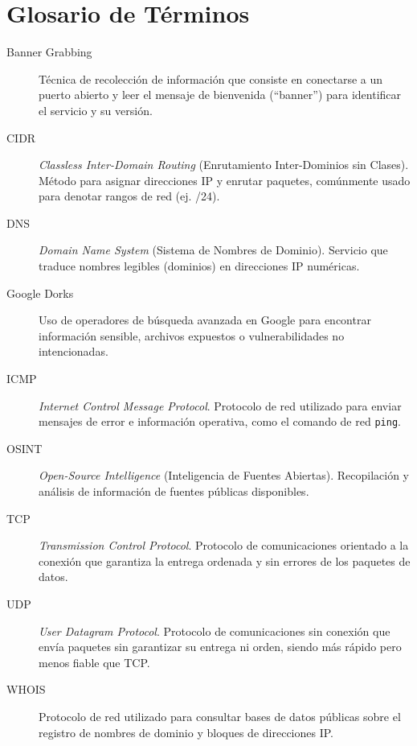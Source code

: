 \documentclass[12pt,a4paper]{article}
\begin{document}
\newpage
\section*{Glosario de Términos}
\begin{description}
    \item[Banner Grabbing] Técnica de recolección de información que consiste en conectarse a un puerto abierto y leer el mensaje de bienvenida (``banner'') para identificar el servicio y su versión.
    \item[CIDR] \textit{Classless Inter-Domain Routing} (Enrutamiento Inter-Dominios sin Clases). Método para asignar direcciones IP y enrutar paquetes, comúnmente usado para denotar rangos de red (ej. /24).
    \item[DNS] \textit{Domain Name System} (Sistema de Nombres de Dominio). Servicio que traduce nombres legibles (dominios) en direcciones IP numéricas.
    \item[Google Dorks] Uso de operadores de búsqueda avanzada en Google para encontrar información sensible, archivos expuestos o vulnerabilidades no intencionadas.
    \item[ICMP] \textit{Internet Control Message Protocol}. Protocolo de red utilizado para enviar mensajes de error e información operativa, como el comando de red \texttt{ping}.
    \item[OSINT] \textit{Open-Source Intelligence} (Inteligencia de Fuentes Abiertas). Recopilación y análisis de información de fuentes públicas disponibles.
    \item[TCP] \textit{Transmission Control Protocol}. Protocolo de comunicaciones orientado a la conexión que garantiza la entrega ordenada y sin errores de los paquetes de datos.
    \item[UDP] \textit{User Datagram Protocol}. Protocolo de comunicaciones sin conexión que envía paquetes sin garantizar su entrega ni orden, siendo más rápido pero menos fiable que TCP.
    \item[WHOIS] Protocolo de red utilizado para consultar bases de datos públicas sobre el registro de nombres de dominio y bloques de direcciones IP.
\end{description}
\end{document}
